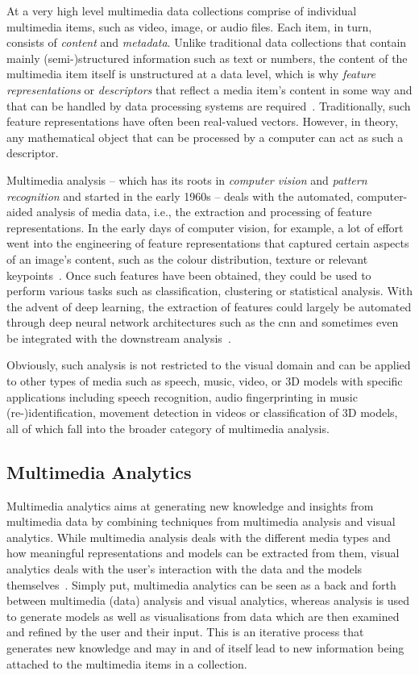 At a very high level multimedia data collections comprise of individual multimedia items, such as video, image, or audio files. Each item, in turn, consists of \emph{content} and \emph{metadata}. Unlike traditional data collections that contain mainly (semi-)structured information such as text or numbers, the content of the multimedia item itself is unstructured at a data level, which is why \emph{feature representations} or \emph{descriptors} that reflect a media item's content in some way and that can be handled by data processing systems are required~\cite{Zahalka:2014Towards}. Traditionally, such feature representations have often been real-valued vectors. However, in theory, any mathematical object that can be processed by a computer can act as such a descriptor. 

Multimedia analysis -- which has its roots in \emph{computer vision} and \emph{pattern recognition} and started in the early 1960s -- deals with the automated, computer-aided analysis of media data, i.e., the extraction and processing of feature representations. In the early days of computer vision, for example, a lot of effort went into the engineering of feature representations that captured certain aspects of an image's content, such as the colour distribution, texture or relevant keypoints~\cite{Lowe:1999object,Bay:2006surf}. Once such features have been obtained, they could be used to perform various tasks such as classification, clustering or statistical analysis. With the advent of deep learning, the extraction of features could largely be automated through deep neural network architectures such as the \acrfull{cnn} and sometimes even be integrated with the downstream analysis~\cite{Goodfellow:2016deep}. 

Obviously, such analysis is not restricted to the visual domain and can be applied to other types of media such as speech, music, video, or 3D models with specific applications including speech recognition, audio fingerprinting in music (re-)identification, movement detection in videos or classification of 3D models, all of which fall into the broader category of multimedia analysis.

\subsection{Multimedia Analytics}

Multimedia analytics aims at generating new knowledge and insights from multimedia data by combining techniques from multimedia analysis and visual analytics. While multimedia analysis deals with the different media types and how meaningful representations and models can be extracted from them, visual analytics deals with the user's interaction with the data and the models themselves~\cite{Chinchor:2010Multimedia,Keim:2010mastering}. Simply put, multimedia analytics can be seen as a back and forth between multimedia (data) analysis and visual analytics, whereas analysis is used to generate models as well as visualisations from data which are then examined and refined by the user and their input. This is an iterative process that generates new knowledge and may in and of itself lead to new information being attached to the multimedia items in a collection.

